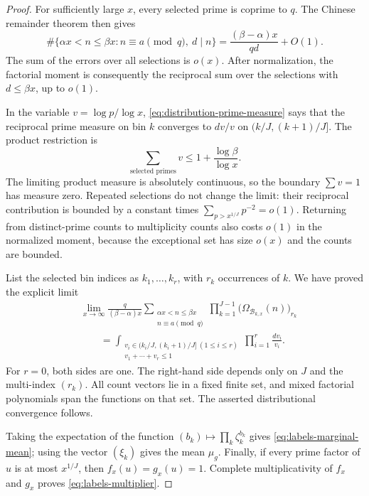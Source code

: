 \begin{proof}
For sufficiently large $x$, every selected prime is coprime to $q$.
The Chinese remainder theorem then gives
\[
 \#\{\alpha x<n\leq\beta x:n\equiv a\pmod q,\ d\mid n\}
 =\frac{(\beta-\alpha)x}{qd}+O(1).
\]
The sum of the errors over all selections is $o(x)$.  After normalization,
the factorial moment is consequently the reciprocal sum over the
selections with $d\leq\beta x$, up to $o(1)$.

In the variable $v=\log p/\log x$, \eqref{eq:distribution-prime-measure}
says that the reciprocal prime measure on bin $k$ converges to $dv/v$
on $(k/J,(k+1)/J]$.  The product restriction is
\[
 \sum_{\text{selected primes}}v\leq1+\frac{\log\beta}{\log x}.
\]
The limiting product measure is absolutely continuous, so the boundary
$\sum v=1$ has measure zero.  Repeated selections do not change the limit:
their reciprocal contribution is bounded by a constant times
$\sum_{p>x^{1/J}}p^{-2}=o(1)$.  Returning from distinct-prime counts to
multiplicity counts also costs $o(1)$ in the normalized moment, because
the exceptional set has size $o(x)$ and the counts are bounded.

List the selected bin indices as $k_1,\ldots,k_r$, with $r_k$
occurrences of $k$.  We have proved the explicit limit
\begin{equation}\label{eq:labels-factorial-limit}
\begin{aligned}
 &\lim_{x\to\infty}\frac{q}{(\beta-\alpha)x}
 \sum_{\substack{\alpha x<n\leq\beta x\\n\equiv a\pmod q}}
       \prod_{k=1}^{J-1}
          \bigl(\Omega_{\mathcal B_{k,x}}(n)\bigr)_{r_k}\\
 &\qquad =
 \int_{\substack{v_i\in(k_i/J,(k_i+1)/J]\ (1\le i\le r)\\
                  v_1+\cdots+v_r\le1}}
       \prod_{i=1}^r\frac{dv_i}{v_i}.
\end{aligned}
\end{equation}
For $r=0$, both sides are one.  The right-hand side depends only on
$J$ and the multi-index $(r_k)$.  All count vectors lie in a fixed
finite set, and mixed factorial polynomials span the functions on that
set.  The asserted distributional convergence follows.

Taking the expectation of the function
$(b_k)\mapsto\prod_k\zeta_k^{b_k}$ gives \eqref{eq:labels-marginal-mean}; using the
vector $(\xi_k)$ gives the mean $\mu_g$.  Finally, if every prime factor
of $u$ is at most $x^{1/J}$, then $f_x(u)=g_x(u)=1$.
Complete multiplicativity of $f_x$ and $g_x$ proves
\eqref{eq:labels-multiplier}.
\end{proof}


